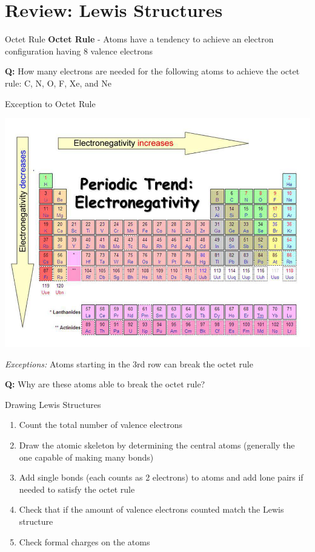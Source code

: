 \documentclass[11pt]{beamer}
\begin{document}
\section{Review: Lewis Structures}

\begin{frame}{Octet Rule}
  \textbf{Octet Rule} - Atoms have a tendency to achieve
  an electron configuration having 8 valence electrons

  \textbf{Q:} How many electrons are needed for the following
  atoms to achieve the octet rule: C, N, O, F, Xe, and Ne
\end{frame}

\begin{frame}{Exception to Octet Rule}
  \begin{center}
    \includegraphics[width=0.75\linewidth]{electronegativity}
  \end{center}
  
  \textit{Exceptions:} Atoms starting in the
    3rd row can break the octet rule

  \textbf{Q:} Why are these atoms able to break
    the octet rule?
\end{frame}

\begin{frame}{Drawing Lewis Structures}
  \begin{enumerate}
  \item Count the total number of valence electrons
  \item Draw the atomic skeleton by determining the central atoms
    (generally the one capable of making many bonds)
  \item Add single bonds (each counts as 2 electrons) to atoms
    and add lone pairs if needed to satisfy the octet rule
  \item Check that if the amount of valence electrons counted match
    the Lewis structure
  \item Check formal charges on the atoms
  \end{enumerate}
\end{frame}
\end{document}
